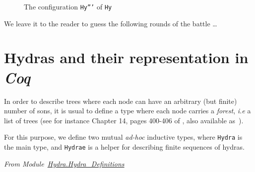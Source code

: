 \begin{figure}[hp]
\caption{The configuration \texttt{Hy'''} of \texttt{Hy} \label{fig:Hy5}}
\end{figure}
\FloatBarrier

We leave it to the reader  to guess the following  rounds of the battle \dots



\section{Hydras and their representation in \emph{Coq}}
\label{sec:orgheadline48}



In order to describe trees where each node can have an arbitrary (but finite) number of sons, it is usual to define a type where each node carries a \emph{forest}, \emph{i.e} a list of trees
(see for instance Chapter 14, pages 400-406 of \cite{BC04}, also available as~\cite{BC04ch14}).

For this purpose, we define two mutual \emph{ad-hoc}  inductive types, where \texttt{Hydra} is the main type, and \texttt{Hydrae} is a helper for describing finite sequences of hydras.
\label{types:Hydra}
\label{types:Hydrae}

\vspace{4pt}
\noindent
\emph{From Module~\href{../theories/html/hydras.Hydra.Hydra_Definitions.html\#Hydra}{Hydra.Hydra\_Definitions}}

